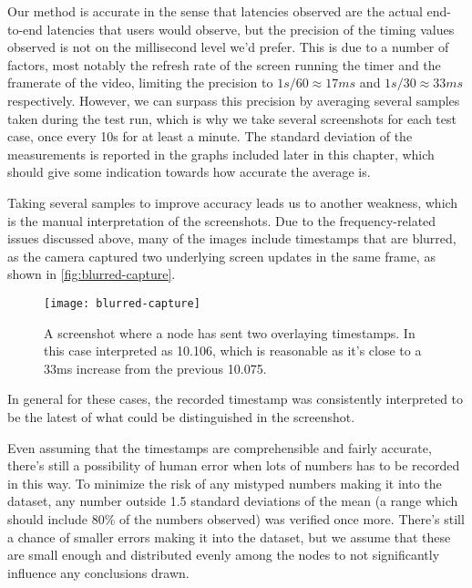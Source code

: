 Our method is accurate in the sense that latencies observed are the actual end-to-end latencies that users would observe, but the precision of the timing values observed is not on the millisecond level we'd prefer. This is due to a number of factors, most notably the refresh rate of the screen running the timer and the framerate of the video, limiting the precision to $1s/60\approx17ms$ and $1s/30\approx33ms$ respectively. However, we can surpass this precision by averaging several samples taken during the test run, which is why we take several screenshots for each test case, once every 10s for at least a minute. The standard deviation of the measurements is reported in the graphs included later in this chapter, which should give some indication towards how accurate the average is.

Taking several samples to improve accuracy leads us to another weakness, which is the manual interpretation of the screenshots. Due to the frequency-related issues discussed above, many of the images include timestamps that are blurred, as the camera captured two underlying screen updates in the same frame, as shown in \autoref{fig:blurred-capture}.

\begin{figure}
    \centering
    \texttt{[image: blurred-capture]}
    \caption{A screenshot where a node has sent two overlaying timestamps. In this case interpreted as 10.106, which is reasonable as it's close to a 33ms increase from the previous 10.075.}
    \label{fig:blurred-capture}
\end{figure}

In general for these cases, the recorded timestamp was consistently interpreted to be the latest of what could be distinguished in the screenshot.

Even assuming that the timestamps are comprehensible and fairly accurate, there's still a possibility of human error when lots of numbers has to be recorded in this way. To minimize the risk of any mistyped numbers making it into the dataset, any number outside 1.5 standard deviations of the mean (a range which should include 80\% of the numbers observed) was verified once more. There's still a chance of smaller errors making it into the dataset, but we assume that these are small enough and distributed evenly among the nodes to not significantly influence any conclusions drawn.

